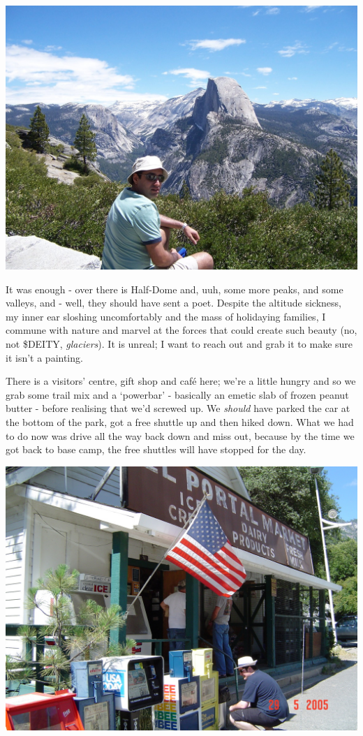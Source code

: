 \documentclass[a5paper,titlepage,11pt]{book}
\begin{document}
\begin{center}\includegraphics[width=\textwidth]{gfx/100_1213}\end{center}

It was enough - over there is Half-Dome and, uuh, some more peaks, and some valleys, and - well, they should have sent a poet. Despite the altitude sickness, my inner ear sloshing uncomfortably and the mass of holidaying families, I commune with nature and marvel at the forces that could create such beauty (no, not \$DEITY, \emph{glaciers}). It is unreal; I want to reach out and grab it to make sure it isn't a painting.

There is a visitors' centre, gift shop and caf\'{e} here; we're a little hungry and so we grab some trail mix and a `powerbar' - basically an emetic slab of frozen peanut butter - before realising that we'd screwed up. We \emph{should} have parked the car at the bottom of the park, got a free shuttle up and then hiked down. What we had to do now was drive all the way back down and miss out, because by the time we got back to base camp, the free shuttles will have stopped for the day.

\begin{center}\includegraphics[width=\textwidth]{gfx/DSC00663}\end{center}
\end{document}
